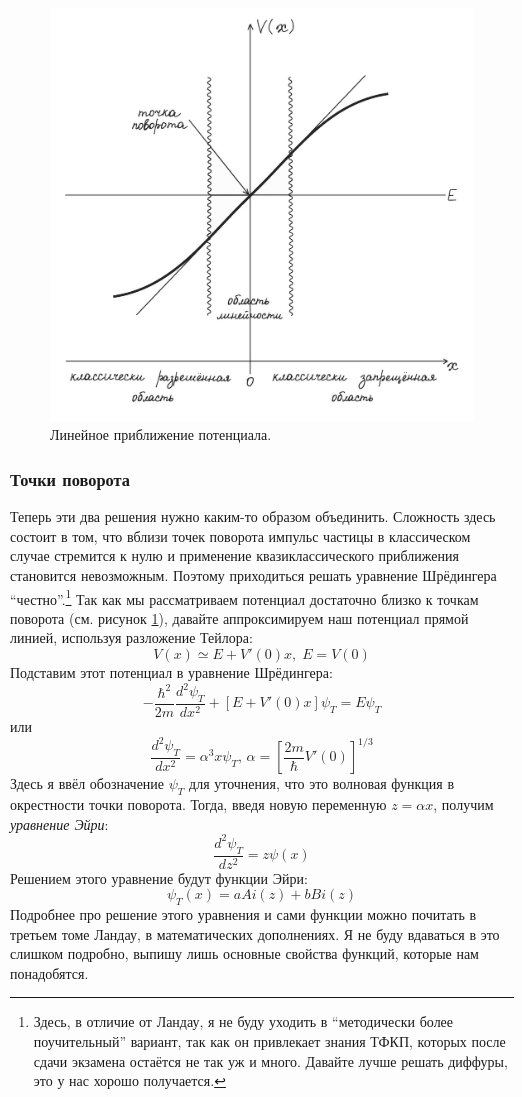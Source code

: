 \begin{figure}[ht]
\centering
\includegraphics[scale=0.28]{class_11/images/turning-point.jpg}
\caption{Линейное приближение потенциала.}
\label{fig 11.2}
\end{figure}

\subsubsection{Точки поворота}
Теперь эти два решения нужно каким-то образом объединить. Сложность здесь состоит в том, что вблизи точек поворота импульс частицы в классическом случае стремится к нулю и применение квазиклассического приближения становится невозможным. Поэтому приходиться решать уравнение Шрёдингера ``честно''.\footnote{Здесь, в отличие от Ландау, я не буду уходить в ``методически более поучительный'' вариант, так как он привлекает знания ТФКП, которых после сдачи экзамена остаётся не так уж и много. Давайте лучше решать диффуры, это у нас хорошо получается.} Так как мы рассматриваем потенциал достаточно близко к точкам поворота (см. рисунок \ref{fig 11.2}), давайте аппроксимируем наш потенциал прямой линией, используя разложение Тейлора:
\[
V(x) \simeq E + V'(0)x,\; E = V(0)
\]
Подставим этот потенциал в уравнение Шрёдингера:
\[
-\frac{\hbar^2}{2m}\frac{d^2 \psi_T}{dx^2} + [E + V'(0)x]\psi_T = E\psi_T
\]
или
\[
\frac{d^2 \psi_T}{dx^2} = \alpha^3 x \psi_T, \, \alpha = \left[ \frac{2m}{\hbar} V'(0) \right]^{1/3}
\]
Здесь я ввёл обозначение $\psi_T$ для уточнения, что это волновая функция в окрестности точки поворота. Тогда, введя новую переменную $z = \alpha x$, получим \textit{уравнение Эйри}:
\[
\frac{d^2 \psi_T}{dz^2} = z\psi(x)
\]
Решением этого уравнение будут функции Эйри:
\[
\psi_T(x) = aAi(z) + bBi(z)
\]
Подробнее про решение этого уравнения и сами функции можно почитать в третьем томе Ландау, в математических дополнениях. Я не буду вдаваться в это слишком подробно, выпишу лишь основные свойства функций, которые нам понадобятся.

